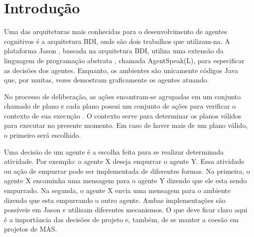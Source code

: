 \chapter{Introdução} \label{chap-introducao}


Uma das arquiteturas mais conhecidas para o desenvolvimento de agentes
cognitivos é a arquitetura BDI, onde
\cite{dastani2009modularity,de2005planning} são dois trabalhos que utilizam-na.
A plataforma Jason \cite{bordini-jason}, baseada na arquitetura BDI,
 utiliza uma extensão da linguagem de programação abstrata \cite{rao1996agentspeak},
 chamada AgentSpeak(L), para especificar as decisões
dos agentes. Enquanto, os ambientes são unicamente códigos Java que, por
muitas, vezes demostram graficamente os agentes atuando.

No processo de deliberação, as ações encontram-se agrupadas em um conjunto
chamado de plano e cada plano possui um conjunto de ações para
verificar o contexto de sua execução \cite{dastani2009modularity}.
O contexto serve para determinar os planos válidos para executar no presente
momento. Em caso de haver mais de um plano válido, o primeiro será escolhido.

Uma decisão de um agente é a escolha feita para se realizar
determinada atividade. Por exemplo: o agente X deseja empurrar o agente Y.
Essa atividade ou ação de empurrar pode ser implementada de diferentes formas. Na
primeira, o agente X encaminha uma mensagem para o agente Y dizendo que ele
esta sendo empurrado. Na segunda, o agente X envia uma mensagem para o
ambiente dizendo que esta empurrando o outro agente.
Ambas implementações são possíveis em Jason e utilizam diferentes
mecanismos. O que deve ficar claro aqui é a importância das decisões de
projeto e, também, de se manter a coesão em projetos de MAS.

